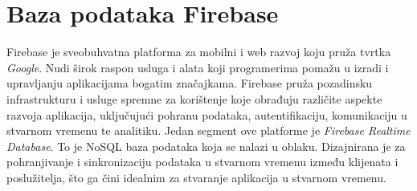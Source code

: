 \chapter{Baza podataka Firebase}

Firebase je sveobuhvatna platforma za mobilni i web razvoj koju pruža tvrtka \textit{Google}. Nudi širok raspon usluga i alata koji programerima pomažu u izradi i upravljanju aplikacijama bogatim značajkama. Firebase pruža pozadinsku infrastrukturu i usluge spremne za korištenje koje obrađuju različite aspekte razvoja aplikacija, uključujući pohranu podataka, autentifikaciju, komunikaciju u stvarnom vremenu te analitiku. Jedan segment ove platforme je \textit{Firebase Realtime Database}. To je NoSQL baza podataka koja se nalazi u oblaku. Dizajnirana je za pohranjivanje i sinkronizaciju podataka u stvarnom vremenu između klijenata i poslužitelja, što ga čini idealnim za stvaranje aplikacija u stvarnom vremenu. \cite{firebase}

